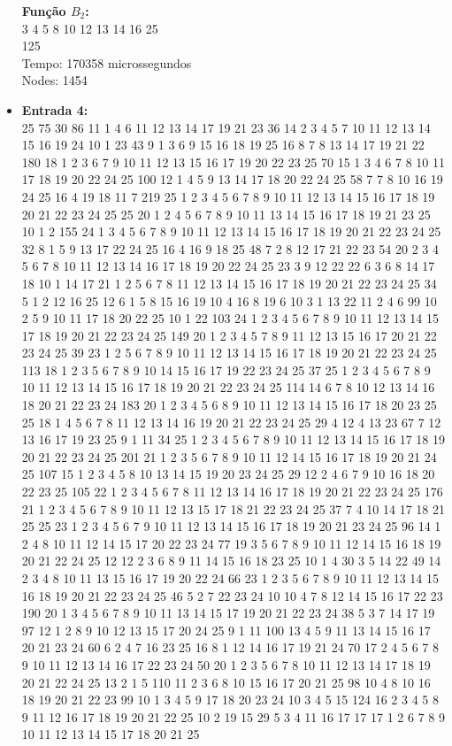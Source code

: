 \documentclass{article}
\begin{document}
\begin{itemize}
    \textbf{Função $B_2$:} \\
    3 4 5 8 10 12 13 14 16 25 \\
    125 \\
    Tempo: 170358 microssegundos \\ 
    Nodes: 1454 \\

    \item \textbf{Entrada 4:} \\ 
    25 75 30 86 11 1 4 6 11 12 13 14 17 19 21 23 36 14 2 3 4 5 7 10 11 12 13 14 15 16 19 24 10 1 23 43 9 1 3 6 9 15 16 18 19 25 16 8 7 8 13 14 17 19 21 22 180 18 1 2 3 6 7 9 10 11 12 13 15 16 17 19 20 22 23 25 70 15 1 3 4 6 7 8 10 11 17 18 19 20 22 24 25 100 12 1 4 5 9 13 14 17 18 20 22 24 25 58 7 7 8 10 16 19 24 25 16 4 19 18 11 7 219 25 1 2 3 4 5 6 7 8 9 10 11 12 13 14 15 16 17 18 19 20 21 22 23 24 25 25 20 1 2 4 5 6 7 8 9 10 11 13 14 15 16 17 18 19 21 23 25 10 1 2 155 24 1 3 4 5 6 7 8 9 10 11 12 13 14 15 16 17 18 19 20 21 22 23 24 25 32 8 1 5 9 13 17 22 24 25 16 4 16 9 18 25 48 7 2 8 12 17 21 22 23 54 20 2 3 4 5 6 7 8 10 11 12 13 14 16 17 18 19 20 22 24 25 23 3 9 12 22 22 6 3 6 8 14 17 18 10 1 14 17 21 1 2 5 6 7 8 11 12 13 14 15 16 17 18 19 20 21 22 23 24 25 34 5 1 2 12 16 25 12 6 1 5 8 15 16 19 10 4 16 8 19 6 10 3 1 13 22 11 2 4 6 99 10 2 5 9 10 11 17 18 20 22 25 10 1 22 103 24 1 2 3 4 5 6 7 8 9 10 11 12 13 14 15 17 18 19 20 21 22 23 24 25 149 20 1 2 3 4 5 7 8 9 11 12 13 15 16 17 20 21 22 23 24 25 39 23 1 2 5 6 7 8 9 10 11 12 13 14 15 16 17 18 19 20 21 22 23 24 25 113 18 1 2 3 5 6 7 8 9 10 14 15 16 17 19 22 23 24 25 37 25 1 2 3 4 5 6 7 8 9 10 11 12 13 14 15 16 17 18 19 20 21 22 23 24 25 114 14 6 7 8 10 12 13 14 16 18 20 21 22 23 24 183 20 1 2 3 4 5 6 8 9 10 11 12 13 14 15 16 17 18 20 23 25 25 18 1 4 5 6 7 8 11 12 13 14 16 19 20 21 22 23 24 25 29 4 12 4 13 23 67 7 12 13 16 17 19 23 25 9 1 11 34 25 1 2 3 4 5 6 7 8 9 10 11 12 13 14 15 16 17 18 19 20 21 22 23 24 25 201 21 1 2 3 5 6 7 8 9 10 11 12 14 15 16 17 18 19 20 21 24 25 107 15 1 2 3 4 5 8 10 13 14 15 19 20 23 24 25 29 12 2 4 6 7 9 10 16 18 20 22 23 25 105 22 1 2 3 4 5 6 7 8 11 12 13 14 16 17 18 19 20 21 22 23 24 25 176 21 1 2 3 4 5 6 7 8 9 10 11 12 13 15 17 18 21 22 23 24 25 37 7 4 10 14 17 18 21 25 25 23 1 2 3 4 5 6 7 9 10 11 12 13 14 15 16 17 18 19 20 21 23 24 25 96 14 1 2 4 8 10 11 12 14 15 17 20 22 23 24 77 19 3 5 6 7 8 9 10 11 12 14 15 16 18 19 20 21 22 24 25 12 12 2 3 6 8 9 11 14 15 16 18 23 25 10 1 4 30 3 5 14 22 49 14 2 3 4 8 10 11 13 15 16 17 19 20 22 24 66 23 1 2 3 5 6 7 8 9 10 11 12 13 14 15 16 18 19 20 21 22 23 24 25 46 5 2 7 22 23 24 10 10 4 7 8 12 14 15 16 17 22 23 190 20 1 3 4 5 6 7 8 9 10 11 13 14 15 17 19 20 21 22 23 24 38 5 3 7 14 17 19 97 12 1 2 8 9 10 12 13 15 17 20 24 25 9 1 11 100 13 4 5 9 11 13 14 15 16 17 20 21 23 24 60 6 2 4 7 16 23 25 16 8 1 12 14 16 17 19 21 24 70 17 2 4 5 6 7 8 9 10 11 12 13 14 16 17 22 23 24 50 20 1 2 3 5 6 7 8 10 11 12 13 14 17 18 19 20 21 22 24 25 13 2 1 5 110 11 2 3 6 8 10 15 16 17 20 21 25 98 10 4 8 10 16 18 19 20 21 22 23 99 10 1 3 4 5 9 17 18 20 23 24 10 3 4 5 15 124 16 2 3 4 5 8 9 11 12 16 17 18 19 20 21 22 25 10 2 19 15 29 5 3 4 11 16 17 17 17 1 2 6 7 8 9 10 11 12 13 14 15 17 18 20 21 25


\end{itemize}
\end{document}
